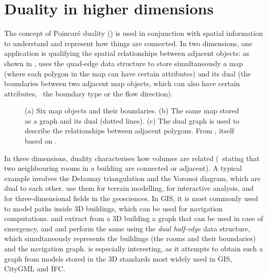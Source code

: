 \section{Duality in higher dimensions}
\label{se:duality}

The concept of Poincar\'e duality () is used in conjunction with spatial information to understand and represent how things are connected.
In two dimensions, one application is qualifying the spatial relationships between adjacent objects: as shown in , \citet{Gold91} uses the quad-edge data structure \citep{Guibas85} to store simultaneously a map (where each polygon in the map can have certain attributes) and its dual (the boundaries between two adjacent map objects, which can also have certain attributes, \eg\ the boundary type or the flow direction).
\begin{figure}[tb]
\centering
{}
{}
{}
\caption[Duality in a 2D map]{(a) Six map objects and their boundaries.
(b) The same map stored as a graph and its dual (dotted lines).
(c) The dual graph is used to describe the relationships between adjacent polygons.
From \citet[Ch.~6]{Ledoux06}, itself based on \citet{Gold91}.}
\label{fig:dual_polygonal_map}
\end{figure}

In three dimensions, duality characterises how volumes are related (\eg\ stating that two neighbouring rooms in a building are connected or adjacent).
A typical example involves the Delaunay triangulation and the Voronoi diagram, which are dual to each other.
\citet{Dakowicz03} use them for terrain modelling, \citet{Lee02} for interactive analysis, and \citet{Ledoux08} for three-dimensional fields in the geosciences.
In GIS, it is most commonly used to model paths inside 3D buildings, which can be used for navigation computations.
\citet{Lee08} and \citet{Lee08a} extract from a 3D building a graph that can be used in case of emergency, and \citet{Boguslawski11a} and \citet{Boguslawski11} perform the same using the \emph{dual half-edge} data structure, which simultaneously represents the buildings (the rooms and their boundaries) and the navigation graph.
\citet{Liu13} is especially interesting, as it attempts to obtain such a graph from models stored in the 3D standards most widely used in GIS, CityGML and IFC.\@

